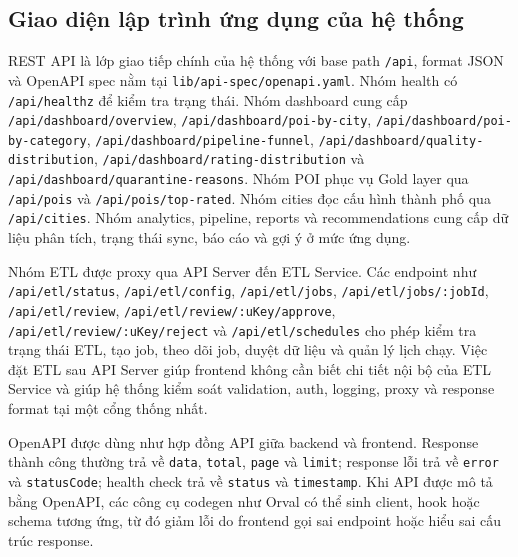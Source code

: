 \documentclass[12pt,a4paper]{article}
\begin{document}
\subsection{Giao diện lập trình ứng dụng của hệ thống}

REST API là lớp giao tiếp chính của hệ thống với base path \texttt{/api}, format JSON và OpenAPI spec nằm tại \texttt{lib/api-spec/openapi.yaml}. Nhóm health có \texttt{/api/healthz} để kiểm tra trạng thái. Nhóm dashboard cung cấp \texttt{/api/dashboard/overview}, \texttt{/api/dashboard/poi-by-city}, \texttt{/api/dashboard/poi-by-category}, \texttt{/api/dashboard/pipeline-funnel}, \texttt{/api/dashboard/quality-distribution}, \texttt{/api/dashboard/rating-distribution} và \texttt{/api/dashboard/quarantine-reasons}. Nhóm POI phục vụ Gold layer qua \texttt{/api/pois} và \texttt{/api/pois/top-rated}. Nhóm cities đọc cấu hình thành phố qua \texttt{/api/cities}. Nhóm analytics, pipeline, reports và recommendations cung cấp dữ liệu phân tích, trạng thái sync, báo cáo và gợi ý ở mức ứng dụng.

Nhóm ETL được proxy qua API Server đến ETL Service. Các endpoint như \texttt{/api/etl/status}, \texttt{/api/etl/config}, \texttt{/api/etl/jobs}, \texttt{/api/etl/jobs/:jobId}, \texttt{/api/etl/review}, \texttt{/api/etl/review/:uKey/approve}, \texttt{/api/etl/review/:uKey/reject} và \texttt{/api/etl/schedules} cho phép kiểm tra trạng thái ETL, tạo job, theo dõi job, duyệt dữ liệu và quản lý lịch chạy. Việc đặt ETL sau API Server giúp frontend không cần biết chi tiết nội bộ của ETL Service và giúp hệ thống kiểm soát validation, auth, logging, proxy và response format tại một cổng thống nhất.

OpenAPI được dùng như hợp đồng API giữa backend và frontend. Response thành công thường trả về \texttt{data}, \texttt{total}, \texttt{page} và \texttt{limit}; response lỗi trả về \texttt{error} và \texttt{statusCode}; health check trả về \texttt{status} và \texttt{timestamp}. Khi API được mô tả bằng OpenAPI, các công cụ codegen như Orval có thể sinh client, hook hoặc schema tương ứng, từ đó giảm lỗi do frontend gọi sai endpoint hoặc hiểu sai cấu trúc response.
\end{document}

